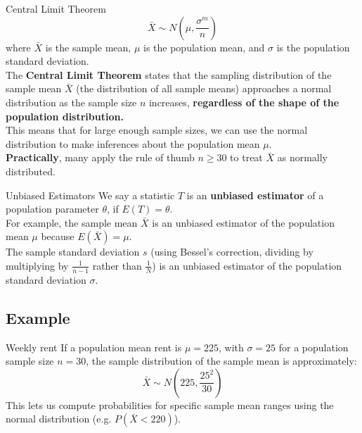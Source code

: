 \documentclass[10pt]{extarticle}
\begin{document}
\begin{definitionbox}{Central Limit Theorem}{}
    $$\bar{X} \sim N\left(\mu, \frac{\sigma^m}{n}\right)$$
    where $\bar{X}$ is the sample mean, $\mu$ is the population mean, and $\sigma$ is the population standard deviation.\\

    The \textbf{Central Limit Theorem} states that the sampling distribution of the sample mean $\bar{X}$ (the distribution of all sample means)  approaches a normal distribution as the sample size $n$ increases, \textbf{regardless of the shape of the population distribution.}\\

    This means that for large enough sample sizes, we can use the normal distribution to make inferences about the population mean $\mu$. \\

    \textbf{Practically}, many apply the rule of thumb $n \geq 30$ to treat $\bar{X}$ as normally distributed.
\end{definitionbox}


\begin{definitionbox}{Unbiased Estimators}{}
    We say a statistic $T$ is an \textbf{unbiased estimator} of a population parameter $\theta$,  if $E(T) = \theta$.\\

    For example, the sample mean $\bar{X}$ is an unbiased estimator of the population mean $\mu$ because $E(\bar{X}) = \mu$.\\

    The sample standard deviation $s$ (using Bessel's correction, dividing by multiplying by $\frac{1}{n-1}$ rather than $\frac{1}{N}$) is an unbiased estimator of the population standard deviation $\sigma$.
\end{definitionbox}

\subsection{Example}
\begin{examplebox}{Weekly rent}{}
    If a population mean rent is $\mu = 225$, with $\sigma = 25$ for a population sample size $n = 30$, the sample distribution of the sample mean is approximately:
    $$\bar{X} \sim N\left(225, \frac{25^2}{30}\right)$$
    This lets us compute probabilities for specific sample mean ranges using the normal distribution (e.g. $P(\bar{X} < 220)$).
\end{examplebox}
\end{document}
